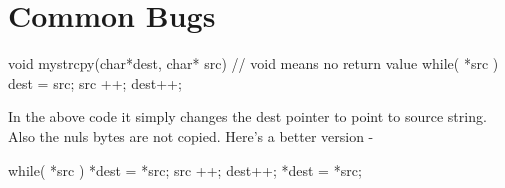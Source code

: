 \begin{comment}
\begin{code}[language=C]

typedef struct {
    int length;
    char c_str[0];
} string;

const char* to_convert = "bhuvan";
int length = strlen(to_convert);

// Let's convert to a c string
string* bhuvan_name;
bhuvan_name = malloc(sizeof(string) + length+1);
/*
Currently, our memory looks like this with junk in those black spaces
                ___ ___ ___ ___ ___ ___ ___ ___ ___ ___ ___
 bhuvan_name = |   |   |   |   |   |   |   |   |   |   |   |
                                                           
*/


bhuvan_name->length = length;
/*
This writes the following values to the first four bytes
The rest is still garbage
                ___ ___ ___ ___ ___ ___ ___ ___ ___ ___ ___
 bhuvan_name = | 0 | 0 | 0 | 6 |   |   |   |   |   |   |   |
                                                           
*/


strcpy(bhuvan_name->c_str, to_convert);
/*
Now our string is filled in correctly at the end of the struct

                ___ ___ ___ ___ ___ ___ ___ ___ ___ ___ ____
 bhuvan_name = | 0 | 0 | 0 | 6 | b | h | u | v | a | n | \0 |
                                                           ‾
*/

strcmp(bhuvan_name->c_str, "bhuvan") == 0 //The strings are equal!
\end{code}

\end{comment}

\section{Common Bugs}

\begin{code}[language=C]
void mystrcpy(char*dest, char* src) { 
  // void means no return value   
  while( *src ) { dest = src; src ++; dest++; }  
}
\end{code}

In the above code it simply changes the dest pointer to point to source
string. Also the nuls bytes are not copied. Here's a better version -

\begin{code}[language=C]
  while( *src ) { *dest = *src; src ++; dest++; } 
  *dest = *src;
\end{code}

